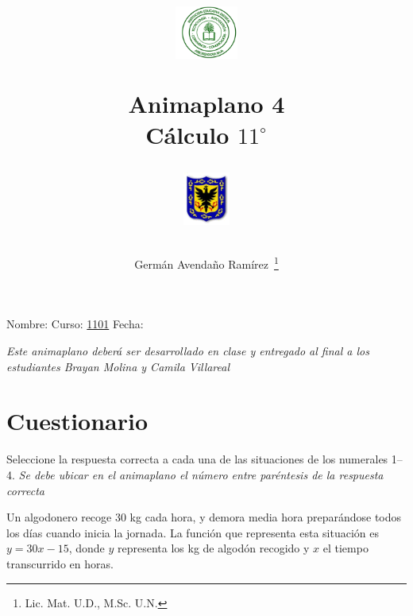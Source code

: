 \documentclass[twoside]{article}
\author{Germ\'an Avenda\~no Ram\'irez~\thanks{Lic. Mat. U.D., M.Sc. U.N.}}
\title{\begin{minipage}{.2\textwidth}
\includegraphics[height=1.75cm]{Images/logo-colegio.png}\end{minipage}
\begin{minipage}{.55\textwidth}
\begin{center}
Animaplano 4\\
Cálculo $11^{\circ}$
\end{center}
\end{minipage}\hfill
\begin{minipage}{.2\textwidth}
\includegraphics[height=1.75cm]{Images/logo-sed.png} 
\end{minipage}}
\date{}
\begin{document}
\maketitle
Nombre: \hrulefill Curso: \underline{1101} Fecha: \underline{\hspace*{2.5cm}}

\textit{Este animaplano deberá ser desarrollado en clase y entregado al final a los estudiantes Brayan Molina y Camila Villareal}
\section{Cuestionario}
Seleccione la respuesta correcta a cada una de las situaciones de los numerales 1--4. \textit{Se debe ubicar en el animaplano el número entre paréntesis de la respuesta correcta}

Un algodonero recoge 30 kg cada hora, y demora media hora preparándose todos los días cuando inicia la jornada. La función que representa esta situación es $y=30x-15$, donde $y$ representa los kg de algodón recogido y $x$ el tiempo transcurrido en horas.
\end{document}
